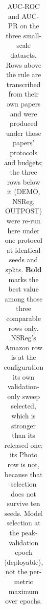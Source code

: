 \begin{table}[t]
\begin{tabular}{lcccccc}
\end{tabular}
\caption{AUC-ROC and AUC-PR on the three small-scale datasets. Rows above the rule are transcribed from their own papers and were produced under those papers' protocols and budgets; the three rows below it (DEMO, NSReg, OUTPOST) were re-run here under one protocol at identical seeds and splits. \textbf{Bold} marks the best value among those three comparable rows only. NSReg's Amazon row is at the configuration its own validation-only sweep selected, which is stronger than its released one; its Photo row is not, because that selection does not survive ten seeds. Model selection at the peak-validation epoch (deployable), not the per-metric maximum over epochs.}
\label{tab:table1_small_valsel}
\end{table}